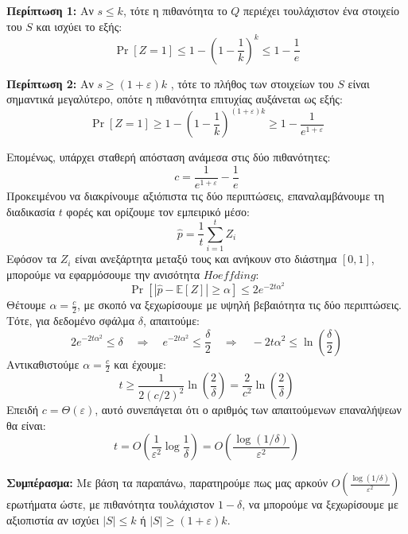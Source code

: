 \documentclass[12pt]{article}
\begin{document}
\vspace{0.5em}
\noindent
\textbf{Περίπτωση 1:} Αν $s \leq k$, τότε η πιθανότητα το $Q$ περιέχει τουλάχιστον ένα στοιχείο του $S$ και ισχύει το εξής:
\begin{equation*}
\Pr[Z = 1] \leq 1 - \left(1 - \frac{1}{k} \right)^k \leq 1 - \frac{1}{e}
\end{equation*}

\vspace{0.5em}
\noindent
\textbf{Περίπτωση 2:} Αν $s \geq (1 + \varepsilon)k$ , τότε το πλήθος των στοιχείων του $S$ είναι σημαντικά μεγαλύτερο, οπότε η πιθανότητα επιτυχίας αυξάνεται ως εξής:
\begin{equation*}
\Pr[Z = 1] \geq 1 - \left(1 - \frac{1}{k} \right)^{(1 + \varepsilon)k} \geq 1 - \frac{1}{e^{1+\varepsilon}}
\end{equation*}

\vspace{0.5em}
\noindent
Επομένως, υπάρχει σταθερή απόσταση ανάμεσα στις δύο πιθανότητες:
\[
c = \frac{1}{e^{1+\varepsilon}} - \frac{1}{e}
\]
Προκειμένου να διακρίνουμε αξιόπιστα τις δύο περιπτώσεις, επαναλαμβάνουμε τη διαδικασία $t$ φορές και ορίζουμε τον εμπειρικό μέσο:
\[
\hat{p} = \frac{1}{t} \sum_{i=1}^t Z_i
\]
Εφόσον τα $Z_i$ είναι ανεξάρτητα μεταξύ τους και ανήκουν στο διάστημα $[0,1]$, μπορούμε να εφαρμόσουμε την ανισότητα $Hoeffding$:
\[
\Pr\left[|\hat{p} - \mathbb{E}[Z]| \geq \alpha \right] \leq 2 e^{-2 t \alpha^2}
\]
Θέτουμε $\alpha = \frac{c}{2}$, με σκοπό να ξεχωρίσουμε με υψηλή βεβαιότητα τις δύο περιπτώσεις. Τότε, για δεδομένο σφάλμα $\delta$, απαιτούμε:
\[
2 e^{-2 t \alpha^2} \leq \delta \quad \Rightarrow \quad
e^{-2 t \alpha^2} \leq \frac{\delta}{2} \quad \Rightarrow \quad
-2 t \alpha^2 \leq \ln\left( \frac{\delta}{2} \right)
\]
Αντικαθιστούμε \(\alpha = \frac{c}{2}\) και έχουμε:
\[
t \geq \frac{1}{2 (c/2)^2} \ln\left( \frac{2}{\delta} \right)
= \frac{2}{c^2} \ln\left( \frac{2}{\delta} \right)
\]
Επειδή $c = \Theta(\varepsilon)$, αυτό συνεπάγεται ότι ο αριθμός των απαιτούμενων επαναλήψεων θα είναι:
\[
t = O\left( \frac{1}{\varepsilon^2} \log \frac{1}{\delta} \right) = O\left( \frac{\log(1/\delta)}{\varepsilon^2} \right)
\]

\vspace{0.5em}
\noindent
\textbf{Συμπέρασμα:} Με βάση τα παραπάνω, παρατηρούμε πως μας αρκούν $O\left( \frac{\log(1/\delta)}{\varepsilon^2} \right)$ ερωτήματα ώστε, με πιθανότητα τουλάχιστον $1 - \delta$, να μπορούμε να ξεχωρίσουμε με αξιοπιστία αν ισχύει $|S| \leq k$ ή $|S| \geq (1 + \varepsilon)k$.
\end{document}
